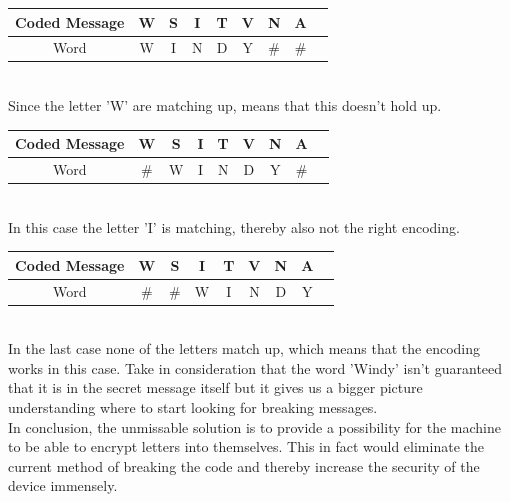 \documentclass[conference,compsoc]{IEEEtran}
\begin{document}
\begin{tabular}{ |c|c|c|c|c|c|c|c|c| }
 \hline
 Coded Message & \cellcolor{red!35}W & S & I & T & V & N & A \\ 
 \hline
 Word & \cellcolor{red!35}W & \cellcolor{green!35}I & \cellcolor{green!35}N & \cellcolor{green!35}D & \cellcolor{green!35}Y & \# & \# \\
 \hline
\end{tabular}\\

Since the letter 'W' are matching up, means that this doesn't hold up.\\

\begin{tabular}{ |c|c|c|c|c|c|c|c|c| }
 \hline
 Coded Message & W & S & \cellcolor{red!35}I & T & V & N & A \\ 
 \hline
 Word & \# & \cellcolor{green!35}W & \cellcolor{red!35}I & \cellcolor{green!35}N & \cellcolor{green!35}D & \cellcolor{green!35}Y & \# \\
 \hline
\end{tabular}\\

In this case the letter 'I' is matching, thereby also not the right encoding.\\

\begin{tabular}{ |c|c|c|c|c|c|c|c|c| }
 \hline
 Coded Message & W & S & I & T & V & N & A \\ 
 \hline
 Word & \# & \# & \cellcolor{green!35}W & \cellcolor{green!35}I & \cellcolor{green!35}N & \cellcolor{green!35}D & \cellcolor{green!35}Y \\
 \hline
\end{tabular}\\


In the last case none of the letters match up, which means that the encoding works in this case. Take in consideration that the word 'Windy' isn't guaranteed that it is in the secret message itself but it gives us a bigger picture understanding where to start looking for breaking messages.\\

In conclusion, the unmissable solution is to provide a possibility for the machine to be able to encrypt letters into themselves. This in fact would eliminate the current method of breaking the code and thereby increase the security of the device immensely. 
\end{document}

